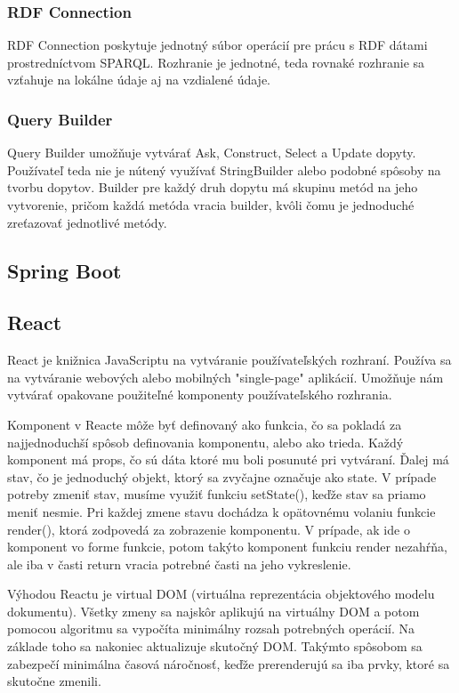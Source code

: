 \subsubsection{RDF Connection}
RDF Connection poskytuje jednotný súbor operácií pre prácu s RDF dátami prostredníctvom SPARQL. Rozhranie je jednotné, teda rovnaké rozhranie sa vzťahuje na lokálne údaje aj na vzdialené údaje.

\subsubsection{Query Builder}
Query Builder umožňuje vytvárať Ask, Construct, Select a Update dopyty.  Používateľ teda nie je nútený využívať StringBuilder alebo podobné spôsoby na tvorbu dopytov. Builder pre každý druh dopytu má skupinu metód na jeho vytvorenie, pričom každá metóda vracia builder, kvôli čomu je jednoduché zreťazovať jednotlivé metódy.


\subsection{Spring Boot} \label{secSpringBoot}

\subsection{React} \label{secReact}
React je knižnica JavaScriptu na vytváranie používateľských rozhraní. Používa sa na vytváranie webových alebo mobilných "single-page" aplikácií.  Umožňuje nám vytvárať opakovane použiteľné komponenty používateľského rozhrania. 

Komponent v Reacte môže byť definovaný ako funkcia, čo sa pokladá za najjednoduchší spôsob definovania komponentu, alebo ako trieda. Každý komponent má props, čo sú dáta ktoré mu boli posunuté pri vytváraní. Ďalej má stav, čo je jednoduchý objekt, ktorý sa zvyčajne označuje ako state. V prípade potreby zmeniť stav, musíme využiť funkciu setState(), keďže stav sa priamo meniť nesmie. Pri každej zmene stavu dochádza k opätovnému volaniu funkcie render(), ktorá zodpovedá za zobrazenie komponentu. V prípade, ak ide o komponent vo forme funkcie, potom takýto komponent funkciu render nezahŕňa, ale iba v časti return vracia potrebné časti na jeho vykreslenie. 

Výhodou Reactu je virtual DOM (virtuálna reprezentácia objektového modelu dokumentu). Všetky zmeny sa najskôr aplikujú na virtuálny DOM a potom pomocou algoritmu sa vypočíta minimálny rozsah potrebných operácií. Na základe toho sa nakoniec aktualizuje skutočný DOM. Takýmto spôsobom sa zabezpečí minimálna časová náročnosť, keďže prerenderujú sa iba prvky, ktoré sa skutočne zmenili.

